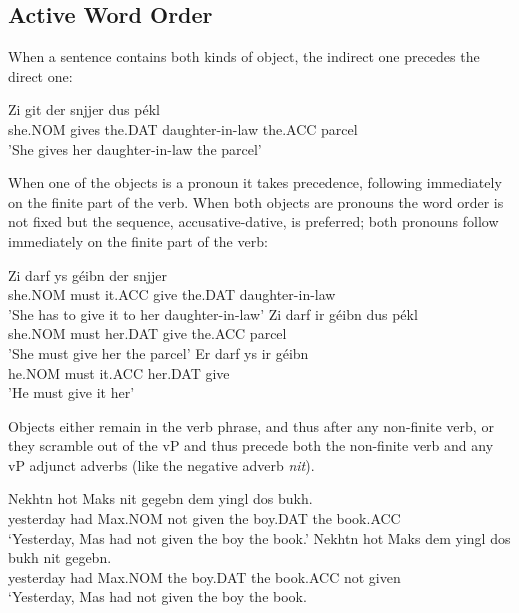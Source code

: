 \subsection{Active Word Order}
When a sentence contains both kinds of object, the indirect one precedes the direct one:
\begin{exe}
\ex \gll Zi git der snjjer dus pékl \\
she.NOM gives the.DAT daughter-in-law the.ACC parcel\\
\trans 'She gives her daughter-in-law the parcel' \citep[ex 190a]{Birnbaum.1979}
\end{exe}
When one of the objects is a pronoun it takes precedence, following immediately on the finite part of the verb. When both objects are pronouns the word order is not fixed but the sequence, accusative-dative, is preferred; both pronouns follow immediately on the finite part of the verb:
\begin{exe}
\ex \gll Zi darf ys géibn der snjjer \\
she.NOM must it.ACC give the.DAT daughter-in-law\\
\trans 'She has to give it to her daughter-in-law' \citep[ex 190b]{Birnbaum.1979}
\ex \gll Zi darf ir géibn dus pékl \\
she.NOM must her.DAT give the.ACC parcel\\
\trans 'She must give her the parcel'\citep[ex 190b]{Birnbaum.1979}
\ex \gll Er darf ys ir géibn \\
he.NOM must it.ACC her.DAT give\\
\trans 'He must give it her'\citep[ex 190c]{Birnbaum.1979}
\end{exe}
Objects either remain in the verb phrase, and thus after any non-finite verb, or they scramble out of the vP and thus precede both the non-finite verb and any vP adjunct adverbs (like the negative adverb \emph{nit}).
\begin{exe}
\ex \gll Nekhtn hot Maks nit gegebn dem yingl dos bukh.\\
yesterday had Max.NOM not given the boy.DAT the book.ACC\\
\trans `Yesterday, Mas had not given the boy the book.'
\ex \gll Nekhtn hot Maks dem yingl dos bukh nit gegebn.\\
yesterday had Max.NOM the boy.DAT the book.ACC not given\\
\trans `Yesterday, Mas had not given the boy the book. \citep[40a]{Diesing.1997}
\end{exe}
